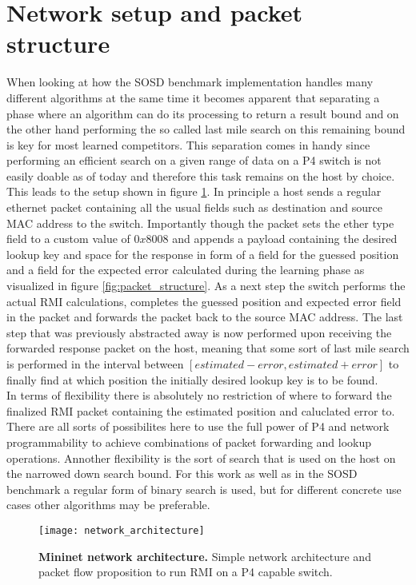\section{Network setup and packet structure}
When looking at how the SOSD benchmark implementation handles many different algorithms at the same time it becomes apparent that separating a phase where an algorithm can do its processing to return a result bound and on the other hand performing the so called last mile search on this remaining bound is key for most learned competitors. This separation comes in handy since performing an efficient search on a given range of data on a P4 switch is not easily doable as of today and therefore this task remains on the host by choice. This leads to the setup shown in figure \ref{fig:network_architecture}. In principle a host sends a regular ethernet packet containing all the usual fields such as destination and source MAC address to the switch. Importantly though the packet sets the ether type field to a custom value of $0x8008$ and appends a payload containing the desired lookup key and space for the response in form of a field for the guessed position and a field for the expected error calculated during the learning phase as visualized in figure  \ref{fig:packet_structure}. As a next step the switch performs the actual RMI calculations, completes the guessed position and expected error field in the packet and forwards the packet back to the source MAC address. The last step that was previously abstracted away is now performed upon receiving the forwarded response packet on the host, meaning that some sort of last mile search is performed in the interval between \([estimated - error, estimated + error]\) to finally find at which position the initially desired lookup key is to be found.\\

In terms of flexibility there is absolutely no restriction of where to forward the finalized RMI packet containing the estimated position and caluclated error to. There are all sorts of possibilites here to use the full power of P4 and network programmability to achieve combinations of packet forwarding and lookup operations. Annother flexibility is the sort of search that is used on the host on the narrowed down search bound. For this work as well as in the SOSD benchmark a regular form of binary search is used, but for different concrete use cases other algorithms may be preferable.

\begin{figure}[ht]
  \centering
  \texttt{[image: network\_architecture]}
  \caption[Network architecture]{
    \textbf{Mininet network architecture.} Simple network architecture and packet flow proposition to run RMI on a P4 capable switch.
  }
  \label{fig:network_architecture}
\end{figure}

